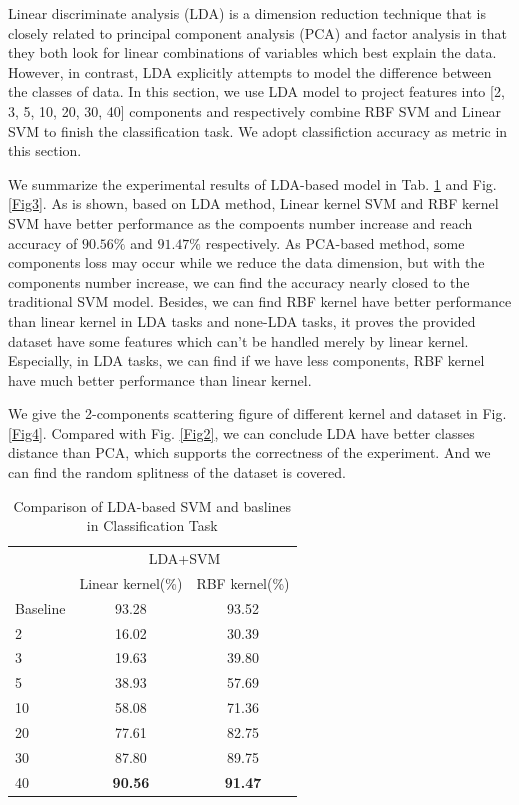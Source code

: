 \documentclass{article}
\begin{document}
Linear discriminate analysis (LDA) is a dimension reduction technique that is closely related to principal component analysis (PCA) and factor analysis in that they both look for linear combinations of variables which best explain the data. However, in contrast, LDA explicitly attempts to model the difference between the classes of data. In this section, we use LDA model to project features into [2, 3, 5, 10, 20, 30, 40] components and respectively combine RBF SVM and Linear SVM to finish the classification task. We adopt classifiction accuracy as metric in this section.

We summarize the experimental results of LDA-based model in Tab. \ref{baseline2} and Fig. \ref{Fig3}. As is shown, based on LDA method, Linear kernel SVM and RBF kernel SVM have better performance as the compoents number increase and reach accuracy of $90.56\%$ and $91.47\%$ respectively. As PCA-based method, some components loss may occur while we reduce the data dimension, but with the components number increase, we can find the accuracy nearly closed to the traditional SVM model. Besides, we can find RBF kernel have better performance than linear kernel in LDA tasks and none-LDA tasks, it proves the provided dataset have some features which can't be handled merely by linear kernel. Especially, in LDA tasks, we can find if we have less components, RBF kernel have much better performance than linear kernel.

We give the 2-components scattering figure of different kernel and dataset in Fig. \ref{Fig4}. Compared with Fig. \ref{Fig2}, we can conclude LDA have better classes distance than PCA, which supports the correctness of the experiment. And we can find the random splitness of the dataset is covered.

\begin{table}[htbp]
	\centering
	\newcommand{\tabincell}[2]{\begin{tabular}{@{}#1@{}}#2\end{tabular}}
	\renewcommand\arraystretch{1.0}
	\caption{Comparison of LDA-based SVM and baslines in Classification Task}
	\label{baseline2}%
	\begin{tabular}{@{}p{2.5cm}<{\centering}|c|c}
		\hline
		\multirow{2}{*}{\diagbox[height=2\line,width=2.9cm,font=\tiny]{$d$}{Acc.}{$\mathit{M}$}} &\multicolumn{2}{c}{LDA+SVM}\\
		\cline{2-3}
			& {Linear kernel(\%)} & {RBF kernel(\%)}\\
		\cline{2-3}
		\hline
		Baseline & 93.28 & 93.52\\
		\hline
		2   & 16.02 & 30.39\\
		\hline
		3   & 19.63 & 39.80\\
		\hline
		5   & 38.93 & 57.69\\
		\hline
		10   & 58.08 & 71.36\\
		\hline
		20   & 77.61 & 82.75\\
		\hline
		30   & 87.80 & 89.75\\
		\hline
		40   & \textbf{90.56} & \textbf{91.47}\\
		\hline
	\end{tabular}
\end{table}
\end{document}
